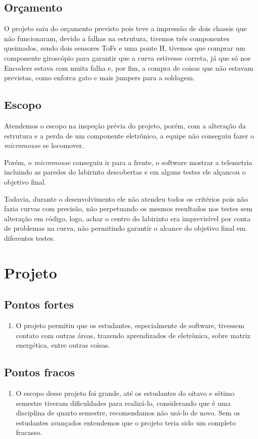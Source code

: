 \subsection{Orçamento}

O projeto saiu do orçamento previsto pois teve a impressão de dois chassis que não funcionaram, devido a falhas na estrutura, tivemos três componentes queimados, sendo dois sensores ToFs e uma ponte H, tivemos que comprar um componente giroscópio para garantir que a curva estivesse correta, já que só nos Encoders estava com muita falha e, por fim, a compra de coisas que não estavam previstas, como enforca gato e mais jumpers para a soldagem.

\subsection{Escopo}

Atendemos o escopo na inspeção prévia do projeto, porém, com a alteração  da estrutura e a perda de um componente eletrõnico, a equipe não conseguiu fazer o \textit{micromouse} se locomover.

Porém, o \textit{micromouse} conseguiu ir para a frente, o software mostrar a telemetria  incluindo as paredes do labirinto descobertas e em alguns testes ele alçancou o objetivo final.

Todavia, durante o desenvolvimento ele não atendeu todos os critérios pois não fazia curvas com precisão, não perpetuando os mesmos resultados nos testes sem alteração em código, logo, achar o centro do labirinto era imprevisível por conta de problemas na curva, não permitindo garantir o alcance do objetivo final em diferentes testes.

\section{Projeto}
\subsection{Pontos fortes}
\begin{enumerate}
	\item O projeto permitiu que os estudantes, especialmente de software, tivessem contato com outras áreas, trazendo aprendizados de eletrônica, sobre matriz energética, entre outras coisas.  
\end{enumerate}
\subsection{Pontos fracos}
\begin{enumerate}
	\item O escopo desse projeto foi grande, até os estudantes do oitavo e sétimo semestre tiveram dificuldades para realizá-lo, considerando que é uma disciplina de quarto semestre, recomendamos não usá-lo de novo. Sem os estudantes avançados entendemos que o projeto teria sido um completo fracasso.
\end{enumerate}

